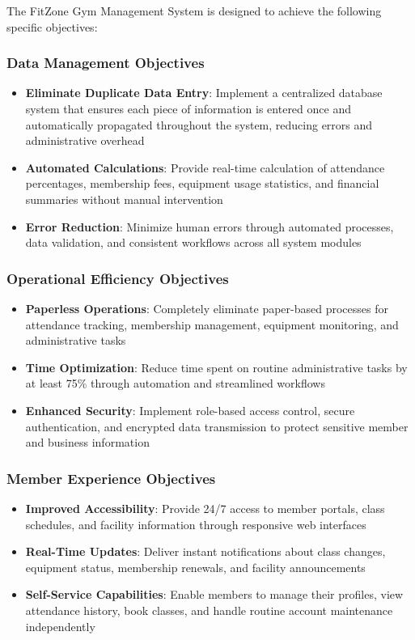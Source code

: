 \documentclass[12pt,a4paper]{report}
\begin{document}
The FitZone Gym Management System is designed to achieve the following specific objectives:

\subsubsection{Data Management Objectives}

\begin{itemize}[leftmargin=*]
    \item \textbf{Eliminate Duplicate Data Entry}: Implement a centralized database system that ensures each piece of information is entered once and automatically propagated throughout the system, reducing errors and administrative overhead
    \item \textbf{Automated Calculations}: Provide real-time calculation of attendance percentages, membership fees, equipment usage statistics, and financial summaries without manual intervention
    \item \textbf{Error Reduction}: Minimize human errors through automated processes, data validation, and consistent workflows across all system modules
\end{itemize}

\subsubsection{Operational Efficiency Objectives}

\begin{itemize}[leftmargin=*]
    \item \textbf{Paperless Operations}: Completely eliminate paper-based processes for attendance tracking, membership management, equipment monitoring, and administrative tasks
    \item \textbf{Time Optimization}: Reduce time spent on routine administrative tasks by at least 75\% through automation and streamlined workflows
    \item \textbf{Enhanced Security}: Implement role-based access control, secure authentication, and encrypted data transmission to protect sensitive member and business information
\end{itemize}

\subsubsection{Member Experience Objectives}

\begin{itemize}[leftmargin=*]
    \item \textbf{Improved Accessibility}: Provide 24/7 access to member portals, class schedules, and facility information through responsive web interfaces
    \item \textbf{Real-Time Updates}: Deliver instant notifications about class changes, equipment status, membership renewals, and facility announcements
    \item \textbf{Self-Service Capabilities}: Enable members to manage their profiles, view attendance history, book classes, and handle routine account maintenance independently
\end{itemize}
\end{document}
